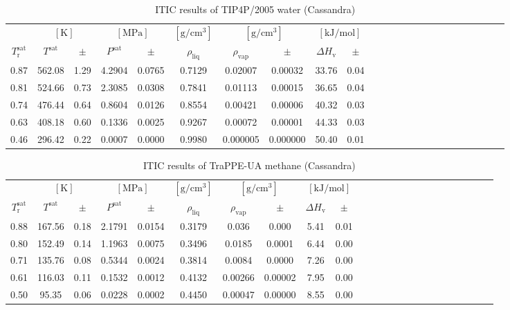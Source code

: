 \documentclass[%
 aip,
 jcp,
 sd,%
 amsmath,amssymb,
]{revtex4-1}
\begin{document}
\begin{table*}[!htbp]
\centering
\caption{
ITIC results of TIP4P/2005 water (Cassandra)
}
\label{tab:TIP4P2005-water-nistsim}
\begin{ruledtabular}
\begin{tabular}{cccccccccccccccccccccccc}
 & \multicolumn{2}{c}{$[\mathrm{K}]$} &	 \multicolumn{2}{c}{$[\mathrm{MPa}]$} & $[\mathrm{g/cm^3}]$ & \multicolumn{2}{c}{$[\mathrm{g/cm^3}]$} & \multicolumn{2}{c}{$[\mathrm{kJ/mol}]$} \\
$T_\mathrm{r}^{\mathrm{sat}}$ & $T^{\mathrm{sat}}$ & $\pm$ & $P^{\mathrm{sat}}$ & $\pm$ & $\rho_{\mathrm{liq}}$ & $\rho_{\mathrm{vap}}$ & $\pm$ & $\Delta H_{\mathrm{v}}$ & $\pm$
 \\
\hline		
0.87	&	562.08	&	1.29	&	4.2904	&	0.0765	&	0.7129	&	0.02007	&	0.00032	&	33.76	&	0.04	\\
0.81	&	524.66	&	0.73	&	2.3085	&	0.0308	&	0.7841	&	0.01113	&	0.00015	&	36.65	&	0.04	\\
0.74	&	476.44	&	0.64	&	0.8604	&	0.0126	&	0.8554	&	0.00421	&	0.00006	&	40.32	&	0.03	\\
0.63	&	408.18	&	0.60	&	0.1336	&	0.0025	&	0.9267	&	0.00072	&	0.00001	&	44.33	&	0.03	\\
0.46	&	296.42	&	0.22	&	0.0007	&	0.0000	&	0.9980	&	0.000005	&	0.000000	&	50.40	&	0.01	\\
\end{tabular}
\end{ruledtabular}
\end{table*}


\begin{table*}[!htbp]
\centering
\caption{
ITIC results of TraPPE-UA methane (Cassandra)
}
\label{tab:TraPPE-C1-nistsim}
\begin{ruledtabular}
\begin{tabular}{cccccccccccccccccccccccc}
 & \multicolumn{2}{c}{$[\mathrm{K}]$} &	 \multicolumn{2}{c}{$[\mathrm{MPa}]$} & $[\mathrm{g/cm^3}]$ & \multicolumn{2}{c}{$[\mathrm{g/cm^3}]$} & \multicolumn{2}{c}{$[\mathrm{kJ/mol}]$} \\
$T_\mathrm{r}^{\mathrm{sat}}$ & $T^{\mathrm{sat}}$ & $\pm$ & $P^{\mathrm{sat}}$ & $\pm$ & $\rho_{\mathrm{liq}}$ & $\rho_{\mathrm{vap}}$ & $\pm$ & $\Delta H_{\mathrm{v}}$ & $\pm$
 \\
\hline		
0.88	&	167.56	&	0.18	&	2.1791	&	0.0154	&	0.3179	&	0.036	&	0.000	&	5.41	&	0.01	\\
0.80	&	152.49	&	0.14	&	1.1963	&	0.0075	&	0.3496	&	0.0185	&	0.0001	&	6.44	&	0.00	\\
0.71	&	135.76	&	0.08	&	0.5344	&	0.0024	&	0.3814	&	0.0084	&	0.0000	&	7.26	&	0.00	\\
0.61	&	116.03	&	0.11	&	0.1532	&	0.0012	&	0.4132	&	0.00266	&	0.00002	&	7.95	&	0.00	\\
0.50	&	95.35	&	0.06	&	0.0228	&	0.0002	&	0.4450	&	0.00047	&	0.00000	&	8.55	&	0.00	\\
\end{tabular}
\end{ruledtabular}
\end{table*}
\end{document}
